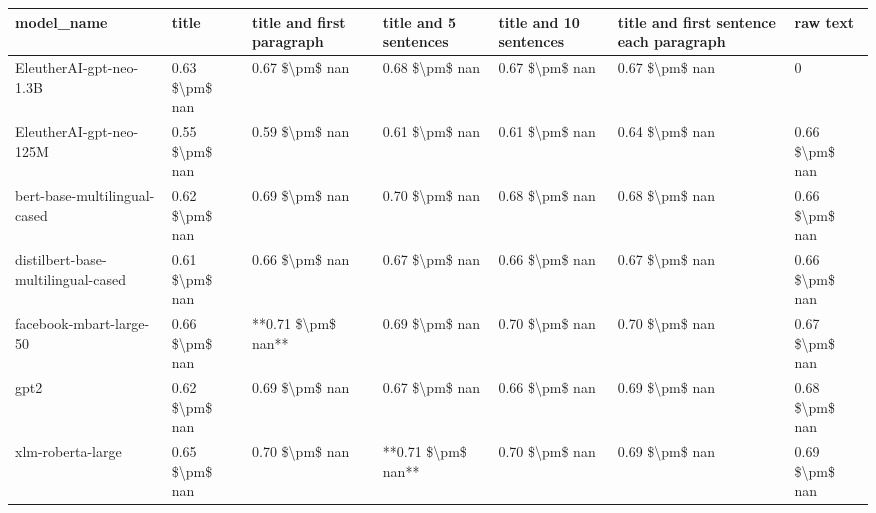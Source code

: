 \begin{tabular}{lllllll}
\toprule
                        model\_name &          title & title and first paragraph & title and 5 sentences & title and 10 sentences & title and first sentence each paragraph &       raw text \\
\midrule
           EleutherAI-gpt-neo-1.3B & 0.63 \$\textbackslash pm\$ nan &            0.67 \$\textbackslash pm\$ nan &        0.68 \$\textbackslash pm\$ nan &         0.67 \$\textbackslash pm\$ nan &                          0.67 \$\textbackslash pm\$ nan &              0 \\
           EleutherAI-gpt-neo-125M & 0.55 \$\textbackslash pm\$ nan &            0.59 \$\textbackslash pm\$ nan &        0.61 \$\textbackslash pm\$ nan &         0.61 \$\textbackslash pm\$ nan &                          0.64 \$\textbackslash pm\$ nan & 0.66 \$\textbackslash pm\$ nan \\
      bert-base-multilingual-cased & 0.62 \$\textbackslash pm\$ nan &            0.69 \$\textbackslash pm\$ nan &        0.70 \$\textbackslash pm\$ nan &         0.68 \$\textbackslash pm\$ nan &                          0.68 \$\textbackslash pm\$ nan & 0.66 \$\textbackslash pm\$ nan \\
distilbert-base-multilingual-cased & 0.61 \$\textbackslash pm\$ nan &            0.66 \$\textbackslash pm\$ nan &        0.67 \$\textbackslash pm\$ nan &         0.66 \$\textbackslash pm\$ nan &                          0.67 \$\textbackslash pm\$ nan & 0.66 \$\textbackslash pm\$ nan \\
           facebook-mbart-large-50 & 0.66 \$\textbackslash pm\$ nan &        **0.71 \$\textbackslash pm\$ nan** &        0.69 \$\textbackslash pm\$ nan &         0.70 \$\textbackslash pm\$ nan &                          0.70 \$\textbackslash pm\$ nan & 0.67 \$\textbackslash pm\$ nan \\
                              gpt2 & 0.62 \$\textbackslash pm\$ nan &            0.69 \$\textbackslash pm\$ nan &        0.67 \$\textbackslash pm\$ nan &         0.66 \$\textbackslash pm\$ nan &                          0.69 \$\textbackslash pm\$ nan & 0.68 \$\textbackslash pm\$ nan \\
                 xlm-roberta-large & 0.65 \$\textbackslash pm\$ nan &            0.70 \$\textbackslash pm\$ nan &    **0.71 \$\textbackslash pm\$ nan** &         0.70 \$\textbackslash pm\$ nan &                          0.69 \$\textbackslash pm\$ nan & 0.69 \$\textbackslash pm\$ nan \\
\bottomrule
\end{tabular}
